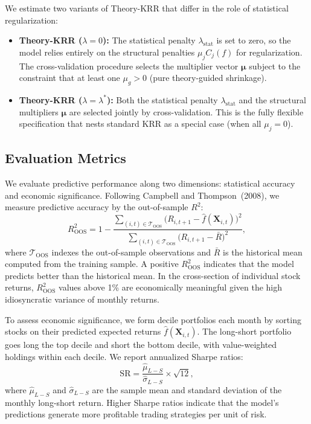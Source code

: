We estimate two variants of Theory-KRR that differ in the role of statistical regularization:
\begin{itemize}
\item \textbf{Theory-KRR ($\lambda = 0$):} The statistical penalty $\lambda_{\mathrm{stat}}$ is set to zero, so the model relies entirely on the structural penalties $\mu_j C_j(f)$ for regularization.
The cross-validation procedure selects the multiplier vector $\bm{\mu}$ subject to the constraint that at least one $\mu_g > 0$ (pure theory-guided shrinkage).
\item \textbf{Theory-KRR ($\lambda = \lambda^*$):} Both the statistical penalty $\lambda_{\mathrm{stat}}$ and the structural multipliers $\bm{\mu}$ are selected jointly by cross-validation.
This is the fully flexible specification that nests standard KRR as a special case (when all $\mu_j = 0$).
\end{itemize}

\subsection{Evaluation Metrics}\label{sub:evaluation}

We evaluate predictive performance along two dimensions: statistical accuracy and economic significance.
Following Campbell and Thompson~(2008), we measure predictive accuracy by the out-of-sample $R^2$:
\begin{equation}\label{eq:r2oos}
R^2_{\mathrm{OOS}} = 1 - \frac{\displaystyle\sum_{(i,t) \in \mathcal{T}_{\mathrm{OOS}}} \bigl(R_{i,t+1} - \hat{f}(\mathbf{X}_{i,t})\bigr)^2}{\displaystyle\sum_{(i,t) \in \mathcal{T}_{\mathrm{OOS}}} \bigl(R_{i,t+1} - \bar{R}\bigr)^2},
\end{equation}
where $\mathcal{T}_{\mathrm{OOS}}$ indexes the out-of-sample observations and $\bar{R}$ is the historical mean computed from the training sample.
A positive $R^2_{\mathrm{OOS}}$ indicates that the model predicts better than the historical mean.
In the cross-section of individual stock returns, $R^2_{\mathrm{OOS}}$ values above 1\% are economically meaningful given the high idiosyncratic variance of monthly returns.

To assess economic significance, we form decile portfolios each month by sorting stocks on their predicted expected returns $\hat{f}(\mathbf{X}_{i,t})$.
The long-short portfolio goes long the top decile and short the bottom decile, with value-weighted holdings within each decile.
We report annualized Sharpe ratios:
\begin{equation}\label{eq:sharpe}
\mathrm{SR} = \frac{\hat{\mu}_{L-S}}{\hat{\sigma}_{L-S}} \times \sqrt{12},
\end{equation}
where $\hat{\mu}_{L-S}$ and $\hat{\sigma}_{L-S}$ are the sample mean and standard deviation of the monthly long-short return.
Higher Sharpe ratios indicate that the model's predictions generate more profitable trading strategies per unit of risk.

